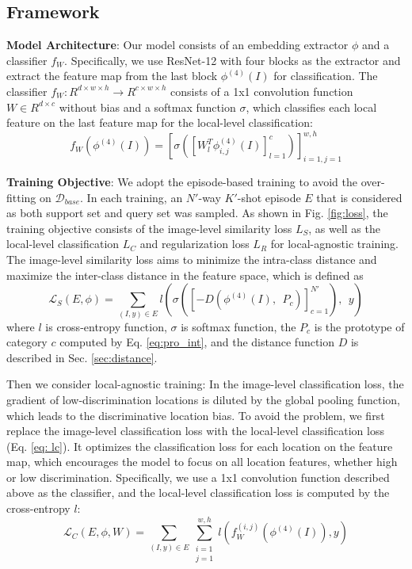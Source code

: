 \documentclass{article}
\begin{document}
\subsection{Framework}
\label{sec:inference}
\noindent\textbf{Model Architecture}: Our model consists of an embedding extractor $\phi$ and a classifier $f_W$. Specifically, we use ResNet-12 \cite{he2016deep} with four blocks as the extractor and extract the feature map from the last block $\phi^{(4)}(I)$ for classification. The classifier $f_W: R^{d\times w\times h} \rightarrow R^{c\times w\times h}$ consists of a 1x1 convolution function $W\in R^{d\times c}$ without bias and a softmax function $\sigma$, which classifies each local feature on the last feature map for the local-level classification:
\begin{equation}
    f_W(\phi^{(4)}(I)) = \left [\sigma([W_l^T \phi^{(4)}_{i, j}(I)]_{l=1}^{c})\right ]_{i=1, j=1}^{w, h}
\end{equation}


\noindent\textbf{Training Objective}: 
We adopt the episode-based training \cite{snell2017prototypical} to avoid the over-fitting on $\mathcal D_{base}$. In each training, an $N'$-way $K'$-shot episode $E$ that is considered as both support set and query set was sampled. As shown in Fig. \ref{fig:loss}, the training objective consists of the image-level similarity loss $L_S$, as well as the local-level classification $L_C$ and regularization loss $L_R$ for local-agnostic training. The image-level similarity loss aims to minimize the intra-class distance and maximize the inter-class distance in the feature space, which is defined as
\begin{equation}
    \label{eq:l_g}
    \mathcal L_S(E, \phi) = \sum_{(I, y) \in E} l(\sigma( [-D(\phi^{(4)}(I),\ \ P_c) ]_{c=1}^{N'} ),\ \ y)
\end{equation}
where $l$ is cross-entropy function, $\sigma$ is softmax function, the $P_c$ is the prototype of category $c$ computed by Eq. \ref{eq:pro_int}, and the distance function $D$ is described in Sec. \ref{sec:distance}.

Then we consider local-agnostic training: In the image-level classification loss, the gradient of low-discrimination locations is diluted by the global pooling function, which leads to the discriminative location bias. To avoid the problem, we first replace the image-level classification loss with the local-level classification loss (Eq. \ref{eq: lc}). It optimizes the classification loss for each location on the feature map, which encourages the model to focus on all location features, whether high or low discrimination. Specifically, we use a 1x1 convolution function described above as the classifier, and the local-level classification loss is computed by the cross-entropy $l$:
\begin{equation}
    \label{eq: lc}
    \mathcal L_C(E, \phi, W) = \sum_{(I, y)\in E} \sum_{\substack{i=1\\ j=1}}^{w, h} l(f_W^{(i, j)}(\phi^{(4)}(I)), y)
\end{equation}
\end{document}
